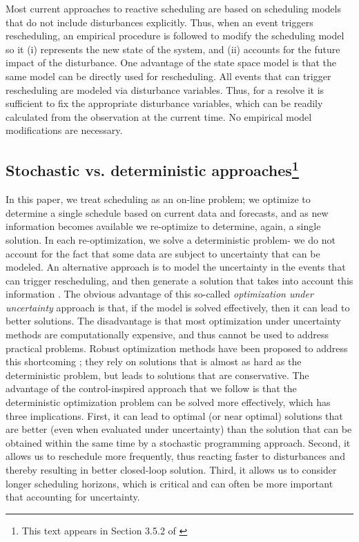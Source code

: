Most current approaches to reactive scheduling are based on scheduling
models that do not include disturbances explicitly. Thus, when an event
triggers rescheduling, an empirical procedure is followed to modify the
scheduling model so it (i) represents the new state of the system, and
(ii) accounts for the future impact of the disturbance. One advantage
of the state space model is that the same model can be directly used
for rescheduling. All events that can trigger rescheduling are modeled
via disturbance variables. Thus, for a resolve it is sufficient to fix
the appropriate disturbance variables, which can be readily calculated
from the observation at the current time. No empirical model
modifications are necessary.

\subsection{Stochastic vs. deterministic approaches\footnote{This text appears in Section 3.5.2 of \citet{subramanian:maravelias:rawlings:2012}}}

In this paper, we treat scheduling as an on-line problem; we optimize
to determine a single schedule based on current data and forecasts,
and as new information becomes available we re-optimize to determine,
again, a single solution. In each re-optimization, we solve a
deterministic problem- we do not account for the fact that some data
are subject to uncertainty that can be modeled. An alternative
approach is to model the uncertainty in the events that can trigger
rescheduling, and then generate a solution that takes into account
this information \citep{li:ierapetritou:2008b,sahinidis:2004}. The
obvious advantage of this so-called {\em{optimization under
    uncertainty}} approach is that, if the model is solved
effectively, then it can lead to better solutions. The disadvantage is
that most optimization under uncertainty methods are computationally
expensive, and thus cannot be used to address practical
problems. Robust optimization methods have been proposed to address
this shortcoming
\citep{ben-tal:nemirovski:2002,verderame:floudas:2009}; they rely on
solutions that is almost as hard as the deterministic problem, but
leads to solutions that are conservative. The advantage of the
control-inspired approach that we follow is that the deterministic
optimization problem can be solved more effectively, which has three
implications. First, it can lead to optimal (or near optimal)
solutions that are better (even when evaluated under uncertainty) than
the solution that can be obtained within the same time by a stochastic
programming approach. Second, it allows us to reschedule more
frequently, thus reacting faster to disturbances and thereby resulting
in better closed-loop solution. Third, it allows us to consider longer
scheduling horizons, which is critical and can often be more
important that accounting for uncertainty.

